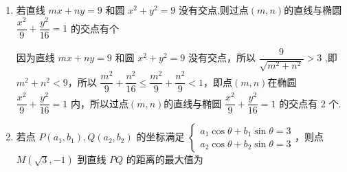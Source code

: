 \begin{enumerate}
\begin{jieda}
    \end{jieda}
    \item 若直线 ${mx} + {ny} = 9$ 和圆 ${x}^{2} + {y}^{2} = 9$ 没有交点,则过点$(m, n)$的直线与椭圆 $\dfrac{{x}^{2}}{9} + \dfrac{{y}^{2}}{16} = 1$ 的交点有个
    \begin{jieda}
        因为直线 ${mx} + {ny} = 9$ 和圆 ${x}^{2} + {y}^{2} = 9$ 没有交点，所以 $\dfrac{9}{\sqrt{{m}^{2} + {n}^{2}}} > 3$ ,即 ${m}^{2} + {n}^{2} < 9$，所以 $\dfrac{{m}^{2}}{9} + \dfrac{{n}^{2}}{16} \leq  \dfrac{{m}^{2}}{9} + \dfrac{{n}^{2}}{9} < 1$，即点$(m, n)$在椭圆 $\dfrac{{x}^{2}}{9} + \dfrac{{y}^{2}}{16} = 1$ 内，所以过点$(m, n)$的直线与椭圆 $\dfrac{{x}^{2}}{9} + \dfrac{{y}^{2}}{16} = 1$ 的交点有 2 个.
    \end{jieda}
    \item 若点 $P(a_1,b_1) ,Q(a_2,b_2)$ 的坐标满足 $\left\{ \begin{array}{l} 
        a_1\cos \theta + b_1\sin \theta = 3 \\  
        a_2\cos \theta + b_2\sin \theta = 3 
    \end{array} \right.$，则点 $M\left( \sqrt{3}, -1\right)$ 到直线 $PQ$ 的距离的最大值为
\end{enumerate}
